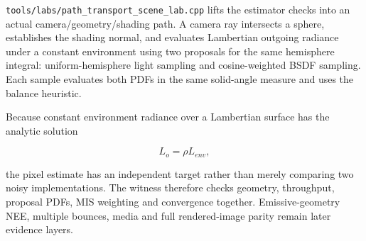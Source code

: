 \hypertarget{appendix-ca8898faf1a6-scene-level-mis-witness}{}

\texttt{tools/labs/path\_transport\_scene\_lab.cpp} lifts the estimator checks into an actual camera/geometry/shading path. A camera ray intersects a sphere, establishes the shading normal, and evaluates Lambertian outgoing radiance under a constant environment using two proposals for the same hemisphere integral: uniform-hemisphere light sampling and cosine-weighted BSDF sampling. Each sample evaluates both PDFs in the same solid-angle measure and uses the balance heuristic.

Because constant environment radiance over a Lambertian surface has the analytic solution

\[
L_o = \rho L_{env},
\]

the pixel estimate has an independent target rather than merely comparing two noisy implementations. The witness therefore checks geometry, throughput, proposal PDFs, MIS weighting and convergence together. Emissive-geometry NEE, multiple bounces, media and full rendered-image parity remain later evidence layers.
